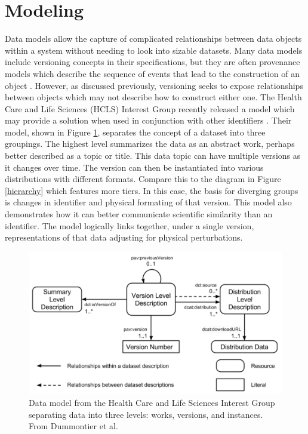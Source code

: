 \section{Modeling} \label{sec:models}

Data models allow the capture of complicated relationships between data objects within a system without needing to look into sizable datasets.
Many data models include versioning concepts in their specifications, but they are often provenance models which describe the sequence of events that lead to the construction of an object \cite{dai2014provenance}.
However, as discussed previously, versioning seeks to expose relationships between objects which may not describe how to construct either one.
The Health Care and Life Sciences (HCLS) Interest Group recently released a model which may provide a solution when used in conjunction with other identifiers \cite{Dummontier2016}.
Their model, shown in Figure \ref{HCLSModel}, separates the concept of a dataset into three groupings.
The highest level summarizes the data as an abstract work, perhaps better described as a topic or title.
This data topic can have multiple versions as it changes over time.
The version can then be instantiated into various distributions with different formats.
Compare this to the diagram in Figure \ref{hierarchy} which features more tiers.
In this case, the basis for diverging groups is changes in identifier and physical formating of that version.
This model also demonstrates how it can better communicate scientific similarity than an identifier.
The model logically links together, under a single version, representations of that data adjusting for physical perturbations.

\begin{figure}%
	\centering
	\includegraphics[scale=0.35]{figures/HCLSModel.png}
	\caption{Data model from the Health Care and Life Sciences Interest Group separating data into three levels: works, versions, and instances.  From Dummontier et al. \cite{Dummontier2016}}
	\label{HCLSModel}
\end{figure}

